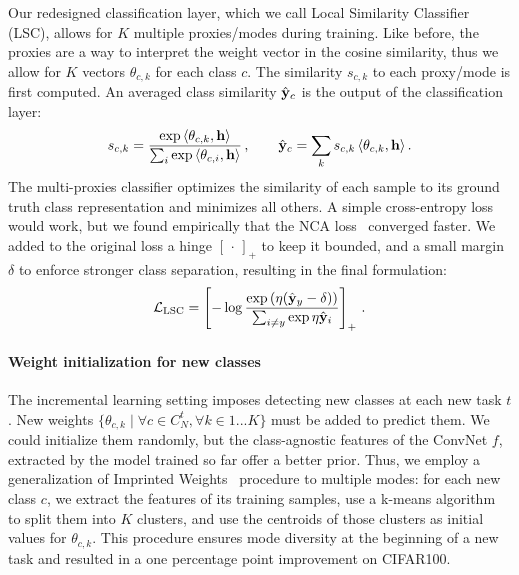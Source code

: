 Our redesigned classification layer, which we call Local Similarity Classifier (LSC), allows for $K$
multiple proxies/modes during training. Like before, the proxies are a way to interpret the weight
vector in the cosine similarity, thus we allow for $K$ vectors $\theta_{c,k}$ for each class $c$.
The similarity $s_{c,k}$ to each proxy/mode is first computed. An averaged class similarity $\hat{\mathbf{y}}_c$
is the output of the classification layer:
%
\begin{equation}
    s_{c,k} =\frac{\exp\,\langle\theta_{c,k},\mathbf{h}\rangle}{\sum_{i} \exp\,\langle\theta_{c,i},\mathbf{h}\rangle}\,, \qquad
    \hat{\mathbf{y}}_c = \sum_{k}s_{c,k}\,\langle\theta_{c,k},\mathbf{h}\rangle\,.
\end{equation}
%
The multi-proxies classifier optimizes the similarity of each sample to its ground truth class
representation and minimizes all others. A simple cross-entropy loss would work, but we found
empirically that the NCA loss~\citep{goldberger2005nca_loss,attias2017proxynca} converged faster. We
added to the original loss a hinge $[\,\cdot\,]_+$ to keep it bounded, and a small margin $\delta$
to enforce stronger class separation, resulting in the final formulation:
%
\begin{equation}
    \mathcal{L}_\text{LSC} = \left[- \log\frac{\exp\left(\eta (\hat{\mathbf{y}}_y - \delta)\right)}{\sum_{i \neq y} \exp \eta \hat{\mathbf{y}}_{i}} \right]_+ \,.
\end{equation}

\paragraph{Weight initialization for new classes} The incremental learning setting imposes detecting
new classes at each new task $t$. New weights $\{\theta_{c,k} \mid \forall c \in C^t_N, \forall k
    \in {1...K}\}$ must be added to predict them. We could initialize them randomly, but the
class-agnostic features of the ConvNet $f$, extracted by the model trained so far offer a better
prior. Thus, we employ a generalization of Imprinted Weights~\citep{qi2018imprintedweights}
procedure to multiple modes: for each new class $c$, we extract the features of its training
samples, use a k-means algorithm to split them into $K$ clusters, and use the centroids of those
clusters as initial values for $\theta_{c,k}$. This procedure ensures mode diversity at the
beginning of a new task and resulted in a one percentage point improvement on CIFAR100.


